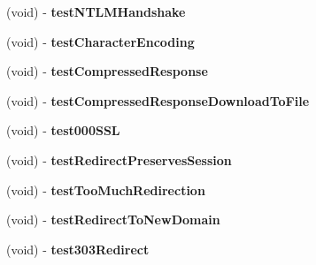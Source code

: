 \begin{DoxyCompactItemize}
\item 
\hypertarget{interface_a_s_i_h_t_t_p_request_tests_a42b76a1c974d5b1b8ff1a22a20381b06}{
(void) -\/ {\bfseries test\-N\-T\-L\-M\-Handshake}}
\label{interface_a_s_i_h_t_t_p_request_tests_a42b76a1c974d5b1b8ff1a22a20381b06}

\item 
\hypertarget{interface_a_s_i_h_t_t_p_request_tests_ae25e5af72786306a726678b3e50efa71}{
(void) -\/ {\bfseries test\-Character\-Encoding}}
\label{interface_a_s_i_h_t_t_p_request_tests_ae25e5af72786306a726678b3e50efa71}

\item 
\hypertarget{interface_a_s_i_h_t_t_p_request_tests_ae884e3724fa16e86e2c9f202fafb0832}{
(void) -\/ {\bfseries test\-Compressed\-Response}}
\label{interface_a_s_i_h_t_t_p_request_tests_ae884e3724fa16e86e2c9f202fafb0832}

\item 
\hypertarget{interface_a_s_i_h_t_t_p_request_tests_ad9fe5125c3c071c35369d0df17222250}{
(void) -\/ {\bfseries test\-Compressed\-Response\-Download\-To\-File}}
\label{interface_a_s_i_h_t_t_p_request_tests_ad9fe5125c3c071c35369d0df17222250}

\item 
\hypertarget{interface_a_s_i_h_t_t_p_request_tests_a91af84b41f3a46f64d16095adb340214}{
(void) -\/ {\bfseries test000\-S\-S\-L}}
\label{interface_a_s_i_h_t_t_p_request_tests_a91af84b41f3a46f64d16095adb340214}

\item 
\hypertarget{interface_a_s_i_h_t_t_p_request_tests_a3132c64a767dc4789eedb611544874b7}{
(void) -\/ {\bfseries test\-Redirect\-Preserves\-Session}}
\label{interface_a_s_i_h_t_t_p_request_tests_a3132c64a767dc4789eedb611544874b7}

\item 
\hypertarget{interface_a_s_i_h_t_t_p_request_tests_abdde777c6d2c53c38bbbd414f01ab11c}{
(void) -\/ {\bfseries test\-Too\-Much\-Redirection}}
\label{interface_a_s_i_h_t_t_p_request_tests_abdde777c6d2c53c38bbbd414f01ab11c}

\item 
\hypertarget{interface_a_s_i_h_t_t_p_request_tests_a0e46e6d0e9b2075145255c89cb0f23ae}{
(void) -\/ {\bfseries test\-Redirect\-To\-New\-Domain}}
\label{interface_a_s_i_h_t_t_p_request_tests_a0e46e6d0e9b2075145255c89cb0f23ae}

\item 
\hypertarget{interface_a_s_i_h_t_t_p_request_tests_a486f80b7859c2c3ea72e06a28fdcf789}{
(void) -\/ {\bfseries test303\-Redirect}}
\label{interface_a_s_i_h_t_t_p_request_tests_a486f80b7859c2c3ea72e06a28fdcf789}


\end{DoxyCompactItemize}
